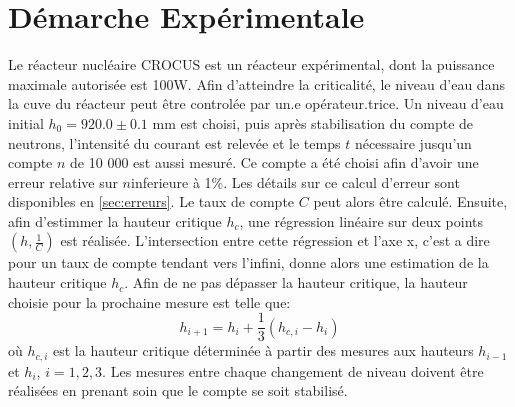\section{Démarche Expérimentale}

Le réacteur nucléaire CROCUS est un réacteur expérimental, dont la puissance maximale autorisée est 100W. Afin d'atteindre la criticalité, le niveau d'eau dans la cuve du réacteur peut être controlée par un.e opérateur.trice. Un niveau d'eau initial \(h_0 = 920.0 \pm 0.1\) mm est choisi, puis après stabilisation du compte de neutrons, l'intensité du courant est relevée et le temps \(t\) nécessaire jusqu'un compte \(n\) de 10 000 est aussi mesuré. Ce compte a été choisi afin d'avoir une erreur relative sur \(n\)inferieure à 1\%. Les détails sur ce calcul d'erreur sont disponibles en \autoref{sec:erreurs}. Le taux de compte \(C\) peut alors être calculé. Ensuite, afin d'estimmer la hauteur critique \(h_c\), une régression linéaire sur deux points \((h, \frac{1}{C})\) est réalisée. L'intersection entre cette régression et l'axe x, c'est a dire pour un taux de compte tendant vers l'infini, donne alors une estimation de la hauteur critique \(h_c\). Afin de ne pas dépasser la hauteur critique, la hauteur choisie pour la prochaine mesure est telle que:
\begin{equation}
    h_{i+1} = h_i + \frac{1}{3}(h_{c,i} - h_i)
\end{equation}
où \(h_{c,i}\) est la hauteur critique déterminée à partir des mesures aux hauteurs \(h_{i-1}\) et \(h_{i}\), \(i=1,2,3\). Les mesures entre chaque changement de niveau doivent être réalisées en prenant soin que le compte se soit stabilisé.


